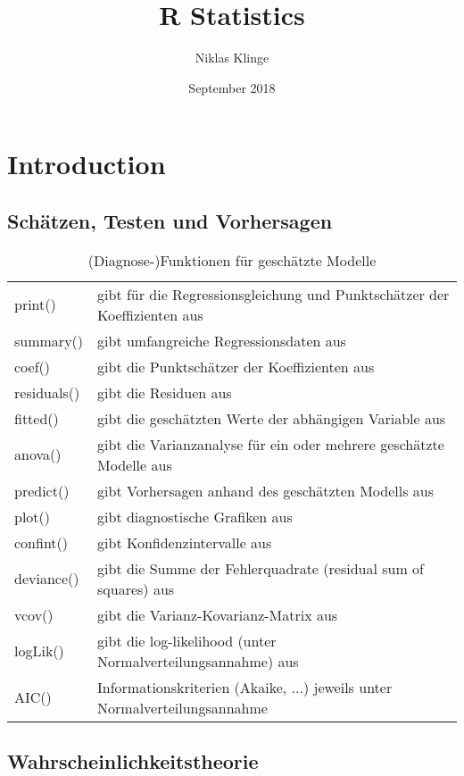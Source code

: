 \documentclass{article}
\title{R Statistics}
\author{Niklas Klinge}
\date{September 2018}
\theoremstyle{definition}
\theoremstyle{remark}
\begin{document}
\maketitle
\tableofcontents

\newpage

\section{Introduction}

\subsection{Schätzen, Testen und Vorhersagen}

\begin{table}[h]
    \centering
    \begin{tabular}{l l}
        print() & gibt für die Regressionsgleichung und Punktschätzer der Koeffizienten aus \\
        summary() & gibt umfangreiche Regressionsdaten aus \\
        coef() & gibt die Punktschätzer der Koeffizienten aus \\
        residuals() & gibt die Residuen aus \\
        fitted() & gibt die geschätzten Werte der abhängigen Variable aus \\
        anova() & gibt die Varianzanalyse für ein oder mehrere geschätzte Modelle aus \\
        predict() & gibt Vorhersagen anhand des geschätzten Modells aus \\
        plot() & gibt diagnostische Grafiken aus \\
        confint() & gibt Konfidenzintervalle aus \\
        deviance() & gibt die Summe der Fehlerquadrate (residual sum of squares) aus \\
        vcov() & gibt die Varianz-Kovarianz-Matrix aus \\
        logLik() & gibt die log-likelihood (unter Normalverteilungsannahme) aus \\
        AIC() & Informationskriterien (Akaike, ...) jeweils unter Normalverteilungsannahme \\
    \end{tabular}
    \caption{(Diagnose-)Funktionen für geschätzte Modelle}
    \label{tab:my_label}
\end{table}

\subsection{Wahrscheinlichkeitstheorie}
\end{document}
